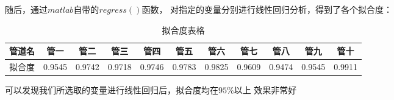             随后，通过$matlab$自带的$regress()$函数，
            对指定的变量分别进行线性回归分析，得到了各个拟合度：
            \begin{table}[H]
                \centering
                \begin{tabular}{|c|c|c|c|c|c|c|c|c|c|c|}
                    \hline
                    管道名&管一&管二&管三&管四&管五&管六&管七&管八&管九&管十\\
                    \hline
                    拟合度&0.9545&0.9742&0.9718&0.9746&0.9783&0.9825&0.9609&0.9474&0.9545&0.9911\\
                    \hline
                \end{tabular}
                \caption{拟合度表格}
            \end{table}
            可以发现我们所选取的变量进行线性回归后，拟合度均在$95\%$以上
            效果非常好
